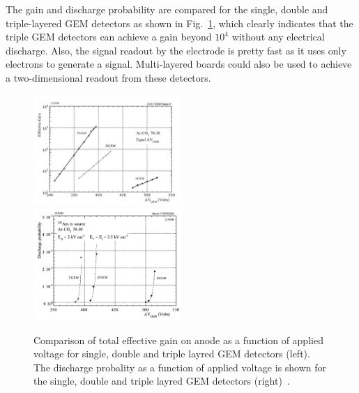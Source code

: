 The gain and discharge probability are compared for the single, double and triple-layered GEM detectors as shown in Fig.~\ref{fig:tripleGEM_discharge_gain}, which clearly indicates that the triple GEM detectors can achieve a gain beyond $10^4$ without any electrical discharge.
Also, the signal readout by the electrode is pretty fast as it uses only electrons to generate a signal. 
Multi-layered boards could also be used to achieve a two-dimensional readout from these detectors.
\begin{figure}[!htbp]
    \centering
    \includegraphics[width=0.5\textwidth]{figures/GEM/Comp_threeGEMS_Gain.png}%
    \includegraphics[width=0.5\textwidth]{figures/GEM/Comp_threeGEMS_DischargeProbability.png}
    \caption{Comparison of total effective gain on anode as a function of applied voltage for single, double and triple layred GEM detectors (left). The discharge probality as a function of applied voltage is shown for the single, double and triple layred GEM detectors (right)~\cite{Bachmann2002}.}
    \label{fig:tripleGEM_discharge_gain}
\end{figure}

